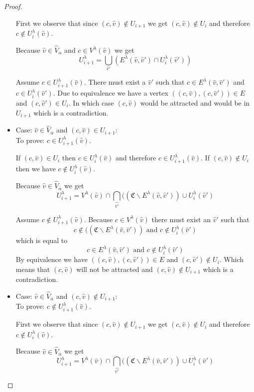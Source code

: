 \begin{lemma}
\begin{proof}
\begin{itemize}
			
			First we observe that since $(c, \hat{v}) \notin U_{i+1}$ we get $(c, \hat{v}) \notin U_{i}$ and therefore $c \notin U^\lambda_i(\hat{v})$.
			
			Because $\hat{v} \in \hat{V}_{\alpha}$ and $c \in V^\lambda(\hat{v})$ we get
			\[ U^\lambda_{i+1} =\bigcup_{\hat{v}'} (E^\lambda(\hat{v},\hat{v}') \cap U^\lambda_i(\hat{v}')) \]
			
			Assume $c \in U^\lambda_{i+1}(\hat{v})$. There must exist a $\hat{v}'$ such that $c \in E^\lambda(\hat{v},\hat{v}')$ and $c \in U^\lambda_i(\hat{v}')$. Due to equivalence we have a vertex $((c,\hat{v}),(c,\hat{v}')) \in E$ and $(c,\hat{v}') \in U_i$. In which case $(c,\hat{v})$ would be attracted and would be in $U_{i+1}$ which is a contradiction.
			\item Case: $\hat{v} \in \hat{V}_{\overline{\alpha}}$ and $(c,\hat{v}) \in U_{i+1}$:\\
			To prove: $c \in U^\lambda_{i+1}(\hat{v})$.
			
			If $(c,\hat{v}) \in U_i$ then $c \in U^\lambda_i(\hat{v})$ and therefore $c \in U^\lambda_{i+1}(\hat{v})$. If $(c,\hat{v}) \notin U_i$ then we have $c \notin U^\lambda_i(\hat{v})$.
			
			Because $\hat{v} \in \hat{V}_{\overline{\alpha}}$ we get
			\[ U^\lambda_{i+1} =V^\lambda(\hat{v}) \cap \bigcap_{\hat{v'}}((\mathfrak{C} \backslash E^\lambda(\hat{v},\hat{v}')) \cup U^\lambda_i(\hat{v}') \]
			
			Assume $c \notin U^\lambda_{i+1}(\hat{v})$. Because $c \in V^\lambda(\hat{v})$ there must exist an $\hat{v}'$ such that
			\[ c \notin ((\mathfrak{C} \backslash E^\lambda(\hat{v},\hat{v}')) \text{ and } c \notin U^\lambda_i(\hat{v}') \]
			which is equal to
			\[ c \in E^\lambda(\hat{v},\hat{v}') \text{ and } c \notin U^\lambda_i(\hat{v}') \]
			By equivalence we have $((c,\hat{v}),(c,\hat{v}')) \in E$ and $(c,\hat{v}') \notin U_i$. Which means that $(c,\hat{v})$ will not be attracted and $(c,\hat{v}) \notin U_{i+1}$ which is a contradiction.
			\item Case: $\hat{v} \in \hat{V}_{\overline{\alpha}}$ and $(c,\hat{v}) \notin U_{i+1}$:\\
			To prove: $c \notin U^\lambda_{i+1}(\hat{v})$.
			
			First we observe that since $(c, \hat{v}) \notin U_{i+1}$ we get $(c, \hat{v}) \notin U_{i}$ and therefore $c \notin U^\lambda_i(\hat{v})$.
			
			Because $\hat{v} \in \hat{V}_{\overline{\alpha}}$ we get
			\[ U^\lambda_{i+1} =V^\lambda(\hat{v}) \cap \bigcap_{\hat{v'}}((\mathfrak{C} \backslash E^\lambda(\hat{v},\hat{v}')) \cup U^\lambda_i(\hat{v}') \]
			

\end{itemize}
\end{proof}
\end{lemma}
